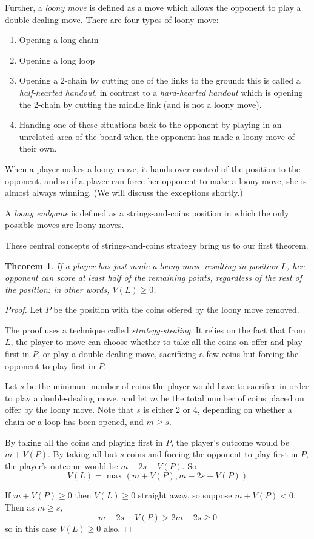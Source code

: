 \documentclass[a4paper,twocolumn]{article}
\newtheorem{sstealing}[thm]{Theorem}
\begin{document}
Further, a \emph{loony move} is defined as a move which allows the
opponent to play a double-dealing move. There are four types of loony
move:

\begin{enumerate}
  \item Opening a long chain
  \item Opening a long loop
  \item Opening a 2-chain by cutting one of the links to the ground:
    this is called a \emph{half-hearted handout}, in contrast to a
    \emph{hard-hearted handout} which is opening the 2-chain by
    cutting the middle link (and is not a loony move).
  \item Handing one of these situations back to the opponent by
    playing in an unrelated area of the board when the opponent has
    made a loony move of their own.
\end{enumerate}

When a player makes a loony move, it hands over control of the
position to the opponent, and so if a player can force her opponent to
make a loony move, she is almost always winning. (We will discuss the
exceptions shortly.)

A \emph{loony endgame} is defined as a strings-and-coins position in
which the only possible moves are loony moves.

These central concepts of strings-and-coins strategy bring us to our
first theorem.

\begin{sstealing}
  If a player has just made a loony move resulting in position $L$,
  her opponent can score at least half of the remaining points,
  regardless of the rest of the position: in other words, $V(L) \ge
  0$.
\end{sstealing}

\begin{proof}
  Let $P$ be the position with the coins offered by the loony move
  removed.
  
  The proof uses a technique called \emph{strategy-stealing}. It
  relies on the fact that from $L$, the player to move can choose
  whether to take all the coins on offer and play first in $P$, or
  play a double-dealing move, sacrificing a few coins but forcing the
  opponent to play first in $P$.

  Let $s$ be the minimum number of coins the player would have to
  sacrifice in order to play a double-dealing move, and let $m$ be the
  total number of coins placed on offer by the loony move. Note that
  $s$ is either 2 or 4, depending on whether a chain or a loop has
  been opened, and $m \ge s$.

  By taking all the coins and playing first in $P$, the player's
  outcome would be $m + V(P)$. By taking all but $s$ coins and forcing
  the opponent to play first in $P$, the player's outcome would be
  $m-2s-V(P)$. So $$V(L) = \max(m+V(P), m-2s-V(P))$$

  If $m+V(P) \ge 0$ then $V(L) \ge 0$ straight away, so suppose
  $m+V(P) < 0$. Then as $m \ge s$, $$m-2s-V(P) > 2m-2s \ge 0$$ so in
  this case $V(L) \ge 0$ also.
\end{proof}
\end{document}
